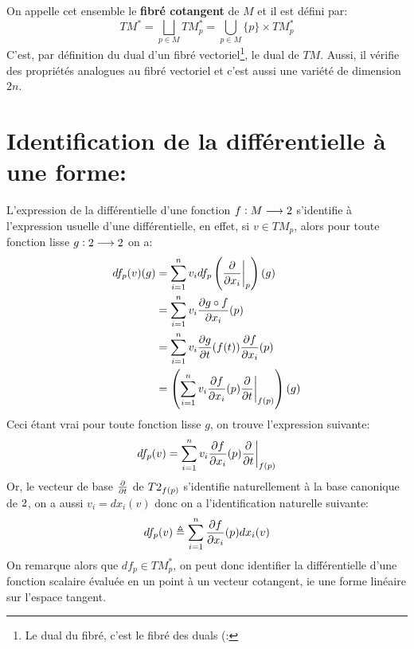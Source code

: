 On appelle cet ensemble le \textbf{fibré cotangent} de \( M \) et il est défini par:
\[ 
   TM^* = \bigsqcup_{p \in M} TM^*_p = \bigcup_{p \in M} \{p\} \times TM^*_p
\]
C'est, par définition du dual d'un fibré vectoriel\footnote[1]{Le dual du fibré, c'est le fibré des duals (:}, le dual de \( TM \). Aussi, il vérifie des propriétés analogues au fibré vectoriel et c'est aussi une variété de dimension \( 2n \).
\section{Identification de la différentielle à une forme:}
L'expression de la différentielle d'une fonction \( f : M \longrightarrow 2 \) s'identifie à l'expression usuelle d'une différentielle, en effet, si \( v \in TM_p \), alors pour toute fonction lisse \( g : 2 \longrightarrow 2 \) on a:
\begin{align*}
   df_p(v)(g) &= \sum_{i=1}^n v_i df_p\left(\frac{\partial }{\partial x_i}\biggr|_p\right)(g)\\
   &= \sum_{i=1}^n v_i \frac{\partial g \circ f}{\partial x_i}(p)\\
   &= \sum_{i=1}^n v_i \frac{\partial g}{\partial t}(f(t))\frac{\partial f}{\partial x_i}(p)\\
   &= \left(\sum_{i=1}^n v_i \frac{\partial f}{\partial x_i}(p)\frac{\partial }{\partial t}\biggr|_{f(p)}\right)(g)
\end{align*}
Ceci étant vrai pour toute fonction lisse \( g \), on trouve l'expression suivante:
\[ 
   df_p(v) = \sum_{i=1}^n v_i \frac{\partial f}{\partial x_i}(p)\frac{\partial }{\partial t}\biggr|_{f(p)}
\]
Or, le vecteur de base \(\frac{\partial }{\partial t}\) de \( T2_{f(p)} \) s'identifie naturellement à la base canonique de \( 2 \), on a aussi \( v_i = dx_i(v) \) donc on a l'identification naturelle suivante:
\[ 
   df_p(v) \triangleq \sum_{i=1}^n \frac{\partial f}{\partial x_i}(p)dx_i(v)
\]
On remarque alors que \( df_p \in TM^*_p \), on peut donc identifier la différentielle d'une fonction scalaire évaluée en un point à un vecteur cotangent, ie une forme linéaire sur l'espace tangent.
